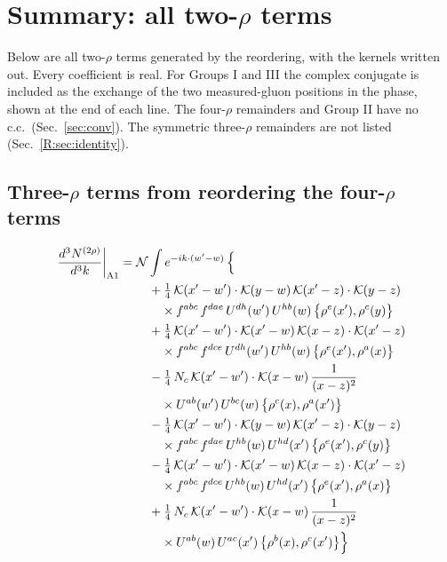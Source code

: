 \documentclass[10pt]{article}
\numberwithin{equation}{section}
\newcommand{\KK}{\mathcal K}
\newcommand{\NN}{\mathcal N}
\begin{document}
\section{Summary: all two-$\rho$ terms}\label{R:sec:summary}
Below are all two-$\rho$ terms generated by the reordering, with the kernels written out. Every coefficient is real. For Groups I and III the complex conjugate is included as the exchange of the two measured-gluon positions in the phase, shown at the end of each line. The four-$\rho$ remainders and Group II have no c.c.\ (Sec.~\ref{sec:conv}). The symmetric three-$\rho$ remainders are not listed (Sec.~\ref{R:sec:identity}).
\subsection*{Three-$\rho$ terms from reordering the four-$\rho$ terms}
\begin{align}
\frac{d^3N^{(2\rho)}}{d^3k}\bigg|_{\rm A1}={}&\NN\int e^{-ik\cdot(w'-w)}\,\Big\{\notag\\
&\quad +\tfrac14\,\KK(x'-w')\cdot\KK(y-w)\,\KK(x'-z)\cdot\KK(y-z)\notag\\
&\qquad\times f^{abc}\,f^{dae}\,U^{dh}(w')\,U^{hb}(w)\,\big\{\rho^{e}(x'),\rho^{c}(y)\big\}\notag\\
&\quad +\tfrac14\,\KK(x'-w')\cdot\KK(x'-w)\,\KK(x-z)\cdot\KK(x'-z)\notag\\
&\qquad\times f^{abc}\,f^{dce}\,U^{dh}(w')\,U^{hb}(w)\,\big\{\rho^{e}(x'),\rho^{a}(x)\big\}\notag\\
&\quad -\tfrac14\,N_{c}\,\KK(x'-w')\cdot\KK(x-w)\,\frac{1}{(x-z)^2}\notag\\
&\qquad\times U^{ab}(w')\,U^{bc}(w)\,\big\{\rho^{c}(x),\rho^{a}(x')\big\}\notag\\
&\quad -\tfrac14\,\KK(x'-w')\cdot\KK(y-w)\,\KK(x'-z)\cdot\KK(y-z)\notag\\
&\qquad\times f^{abc}\,f^{dae}\,U^{hb}(w)\,U^{hd}(x')\,\big\{\rho^{e}(x'),\rho^{c}(y)\big\}\notag\\
&\quad -\tfrac14\,\KK(x'-w')\cdot\KK(x'-w)\,\KK(x-z)\cdot\KK(x'-z)\notag\\
&\qquad\times f^{abc}\,f^{dce}\,U^{hb}(w)\,U^{hd}(x')\,\big\{\rho^{e}(x'),\rho^{a}(x)\big\}\notag\\
&\quad +\tfrac14\,N_{c}\,\KK(x'-w')\cdot\KK(x-w)\,\frac{1}{(x-z)^2}\notag\\
&\qquad\times U^{ab}(w)\,U^{ac}(x')\,\big\{\rho^{b}(x),\rho^{c}(x')\big\}\Big\}\label{R:eq:sum-A1}
\end{align}
\end{document}
